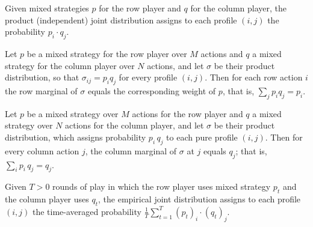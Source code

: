 \begin{definition}
\label{productDistribution}
\leanok
{}
Given mixed strategies $p$ for the row player and $q$ for the column player,
the product (independent) joint distribution assigns to each profile $(i,j)$
the probability $p_i \cdot q_j$.
\end{definition}

\begin{lemma}
\label{productDistribution_rowMarginal}
\leanok
{}
Let $p$ be a mixed strategy for the row player over $M$ actions and $q$ a mixed strategy
for the column player over $N$ actions, and let $\sigma$ be their product distribution,
so that $\sigma_{ij} = p_i q_j$ for every profile $(i,j)$. Then for each row action $i$
the row marginal of $\sigma$ equals the corresponding weight of $p$, that is, $\sum_{j}
p_i q_j = p_i$.
\end{lemma}

\begin{lemma}
\label{productDistribution_colMarginal}
\leanok
{}
Let $p$ be a mixed strategy over $M$ actions for the row player and $q$ a mixed strategy
over $N$ actions for the column player, and let $\sigma$ be their product distribution,
which assigns probability $p_i\,q_j$ to each pure profile $(i,j)$. Then for every column
action $j$, the column marginal of $\sigma$ at $j$ equals $q_j$; that is, $\sum_{i}
p_i\,q_j = q_j$.
\end{lemma}

\begin{definition}
\label{empiricalJoint}
\leanok
{}
Given $T > 0$ rounds of play in which the row player uses mixed strategy $p_t$
and the column player uses $q_t$, the empirical joint distribution assigns to
each profile $(i,j)$ the time-averaged probability
$\frac{1}{T}\sum_{t=1}^{T} (p_t)_i \cdot (q_t)_j$.
\end{definition}


